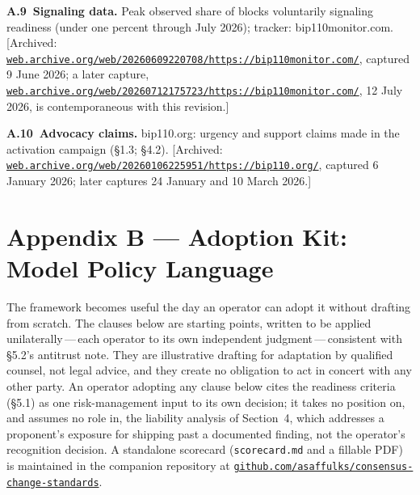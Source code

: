 \documentclass[11pt, twoside, openright]{book}
\newcommand{\reqitem}[2]{\medskip\noindent\textbf{#1\ #2}\quad\ignorespaces}
\newcommand{\sect}[1]{\S#1}
\begin{document}
\reqitem{A.9}{Signaling data.} Peak observed share of blocks voluntarily signaling readiness (under one percent through July 2026); tracker: bip110monitor.com. [Archived: \href{https://web.archive.org/web/20260609220708/https://bip110monitor.com/}{\nolinkurl{web.archive.org/web/20260609220708/https://bip110monitor.com/}}, captured 9 June 2026; a later capture, \href{https://web.archive.org/web/20260712175723/https://bip110monitor.com/}{\nolinkurl{web.archive.org/web/20260712175723/https://bip110monitor.com/}}, 12 July 2026, is contemporaneous with this revision.]

\reqitem{A.10}{Advocacy claims.} bip110.org: urgency and support claims made in the activation campaign (\sect{1.3}; \sect{4.2}). [Archived: \href{https://web.archive.org/web/20260106225951/https://bip110.org/}{\nolinkurl{web.archive.org/web/20260106225951/https://bip110.org/}}, captured 6 January 2026; later captures 24 January and 10 March 2026.]

\chapter{Appendix B --- Adoption Kit: Model Policy Language}

The framework becomes useful the day an operator can adopt it without drafting from scratch. The clauses below are starting points, written to be applied unilaterally\,---\,each operator to its own independent judgment\,---\,consistent with \sect{5.2}'s antitrust note. They are illustrative drafting for adaptation by qualified counsel, not legal advice, and they create no obligation to act in concert with any other party. An operator adopting any clause below cites the readiness criteria (\sect{5.1}) as one risk-management input to its own decision; it takes no position on, and assumes no role in, the liability analysis of Section~4, which addresses a proponent's exposure for shipping past a documented finding, not the operator's recognition decision. A standalone scorecard (\texttt{scorecard.md} and a fillable PDF) is maintained in the companion repository at \href{https://github.com/asaffulks/consensus-change-standards}{\nolinkurl{github.com/asaffulks/consensus-change-standards}}.
\end{document}

